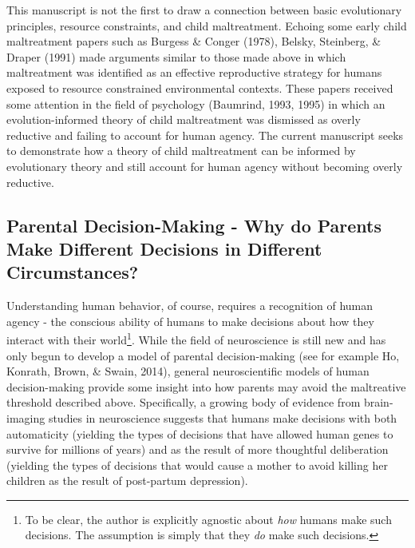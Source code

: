 \documentclass[review]{elsarticle}\usepackage[]{graphicx}\usepackage[]{color}
\begin{document}
This manuscript is not the first to draw a connection between basic
evolutionary principles, resource constraints, and child maltreatment.
Echoing some early child maltreatment papers such as Burgess \& Conger
(1978), Belsky, Steinberg, \& Draper (1991) made arguments similar to
those made above in which maltreatment was identified as an effective
reproductive strategy for humans exposed to resource constrained
environmental contexts. These papers received some attention in the
field of psychology (Baumrind, 1993, 1995) in which an
evolution-informed theory of child maltreatment was dismissed as overly
reductive and failing to account for human agency. The current
manuscript seeks to demonstrate how a theory of child maltreatment can
be informed by evolutionary theory and still account for human agency
without becoming overly reductive.

\subsection{Parental Decision-Making - Why do Parents Make Different
Decisions in Different
Circumstances?}\label{parental-decision-making---why-do-parents-make-different-decisions-in-different-circumstances}

Understanding human behavior, of course, requires a recognition of human
agency - the conscious ability of humans to make decisions about how
they interact with their world\footnote{To be clear, the author is
  explicitly agnostic about \emph{how} humans make such decisions. The
  assumption is simply that they \emph{do} make such decisions.}. While
the field of neuroscience is still new and has only begun to develop a
model of parental decision-making (see for example Ho, Konrath, Brown,
\& Swain, 2014), general neuroscientific models of human decision-making
provide some insight into how parents may avoid the maltreative
threshold described above. Specifically, a growing body of evidence from
brain-imaging studies in neuroscience suggests that humans make
decisions with both automaticity (yielding the types of decisions that
have allowed human genes to survive for millions of years) and as the
result of more thoughtful deliberation (yielding the types of decisions
that would cause a mother to avoid killing her children as the result of
post-partum depression).
\end{document}

